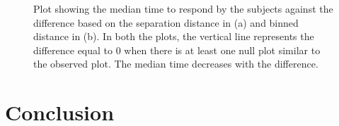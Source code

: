 \documentclass[12]{article}
\newcommand{\red}[1]{{\color{red} #1}}
\newcommand{\green}[1]{{\color{cyan} #1}}
\begin{document}
\begin{figure}[hbtp]
{\label{t1bin_1}
}
	\vspace{-.1in}
\caption[Optional caption for list of figures]{Plot showing the median time to respond by the subjects against the difference based on the separation distance in (a) and binned distance in (b). In both the plots, the vertical line represents the difference equal to 0 when there is at least one null plot similar to the observed plot. The median time decreases with the difference.  }
\end{figure}




\section{Conclusion}
 
%



\end{document}
